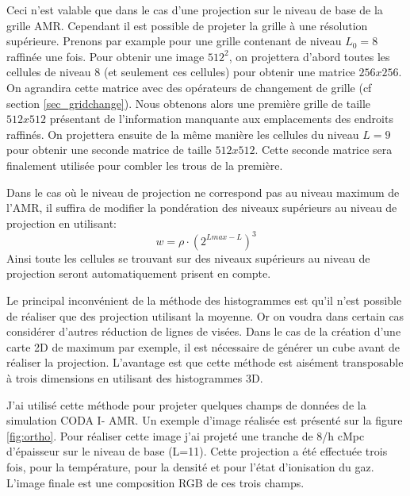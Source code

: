 Ceci n'est valable que dans le cas d'une projection sur le niveau de base de la grille \ac{AMR}.
Cependant il est possible de projeter la grille à une résolution supérieure.
Prenons par example pour une grille contenant de niveau $L_{0}=8$ raffinée une fois.
Pour obtenir une image $512^2$, on projettera d'abord toutes les cellules de niveau 8 (et seulement ces cellules) pour obtenir une matrice $256x256$.
On agrandira cette matrice avec des opérateurs de changement de grille (cf section \ref{sec_gridchange}).
Nous obtenons alors une première grille de taille $512x512$ présentant de l'information manquante aux emplacements des endroits raffinés.
On projettera ensuite de la même manière les cellules du niveau $L=9$ pour obtenir une seconde matrice de taille $512x512$.
Cette seconde matrice sera finalement utilisée pour combler les trous de la première.

Dans le cas où le niveau de projection ne correspond pas au niveau maximum de l'\ac{AMR}, il suffira de modifier la pondération des niveaux supérieurs au niveau de projection en utilisant:
\begin{equation}
w = \rho \cdot \left( 2^{Lmax-L} \right)^3
\end{equation}
Ainsi toute les cellules se trouvant sur des niveaux supérieurs au niveau de projection seront automatiquement prisent en compte.

Le principal inconvénient de la méthode des histogrammes est qu'il n'est possible de réaliser que des projection utilisant la moyenne.
Or on voudra dans certain cas considérer d'autres réduction de lignes de visées.
Dans le cas de la création d'une carte 2D de maximum par exemple, il est nécessaire de générer un cube avant de réaliser la projection.
L'avantage est que cette méthode est aisément transposable à trois dimensions en utilisant des histogrammes 3D.




J'ai utilisé cette méthode pour projeter quelques champs de données de la simulation CODA I- AMR.
Un exemple d'image réalisée est présenté sur la figure \ref{fig:ortho}.
Pour réaliser cette image j'ai projeté une tranche de 8/h cMpc d'épaisseur sur le niveau de base (L=11).
Cette projection a été effectuée trois fois, pour la température, pour la densité et pour l'état d'ionisation du gaz.
L'image finale est une composition RGB de ces trois champs.

